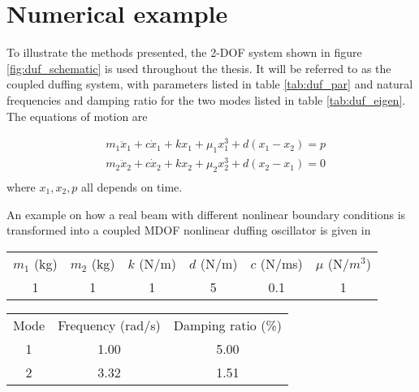 
\section{Numerical example}
\label{sec:numerical-example}


To illustrate the methods presented, the 2-DOF system shown in figure
\ref{fig:duf_schematic} is used throughout the thesis. It will be referred to as
the coupled duffing system, with parameters listed in table \ref{tab:duf_par}
and natural frequencies and damping ratio for the two modes listed in table
\ref{tab:duf_eigen}. The equations of motion are

\begin{equation}
  \begin{aligned}
    &m_1\ddot x_1 + c \dot x_1 + kx_1 + \mu_1x_1^3 + d(x_1 - x_2) = p \\
    &m_2\ddot x_2 + c \dot x_2 + kx_2 + \mu_2x_2^3 + d(x_2 - x_1) = 0 \\
  \end{aligned}
\end{equation}
where $x_1,x_2, p$ all depends on time.

An example on how a real beam with different nonlinear boundary conditions is
transformed into a coupled MDOF nonlinear duffing oscillator is given in
\textcite{mhermansen2017a}


\begin{center}
  \begin{tabular}{*{6}{c}}
    \hline
    $m_1$ (kg) & $m_2$ (kg) & $k$ (N/m) & $d$ (N/m) & $c$ (N/ms) & $\mu$ (N/$m^3$) \\
    1 & 1 & 1 & 5 & 0.1 & 1 \\
    \hline
  \end{tabular}
  \label{tab:duf_par}
\end{center}


\begin{center}
  \begin{tabular}{*{3}{c}}
    \hline
    Mode & Frequency (rad/s) & Damping ratio (\%) \\
    1 & 1.00 & 5.00 \\
    2 & 3.32 & 1.51 \\
    \hline
  \end{tabular}
  \label{tab:duf_eigen}
\end{center}


